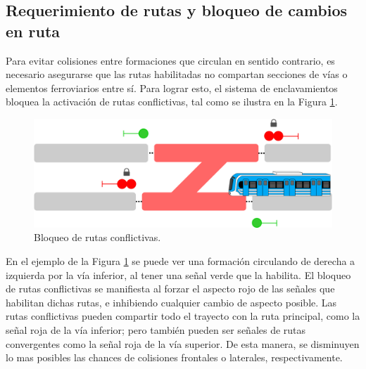 \subsection{Requerimiento de rutas y bloqueo de cambios en ruta}

	Para evitar colisiones entre formaciones que circulan en sentido contrario, es necesario asegurarse que las rutas habilitadas no compartan secciones de vías o elementos ferroviarios entre sí. Para lograr esto, el sistema de enclavamientos bloquea la activación de rutas conflictivas, tal como se ilustra en la Figura \ref{fig:ACG_bloqueo}.

    \begin{figure}[!h]
        \centering
        \includegraphics[width=1\textwidth]{Figuras/bloqueo_rutas}
        \centering\caption{Bloqueo de rutas conflictivas.}
        \label{fig:ACG_bloqueo}
    \end{figure}

	En el ejemplo de la Figura \ref{fig:ACG_bloqueo} se puede ver una formación circulando de derecha a izquierda por la vía inferior, al tener una señal verde que la habilita. El bloqueo de rutas conflictivas se manifiesta al forzar el aspecto rojo de las señales que habilitan dichas rutas, e inhibiendo cualquier cambio de aspecto posible. Las rutas conflictivas pueden compartir todo el trayecto con la ruta principal, como la señal roja de la vía inferior; pero también pueden ser señales de rutas convergentes como la señal roja de la vía superior. De esta manera, se disminuyen lo mas posibles las chances de colisiones frontales o laterales, respectivamente.
	
	
